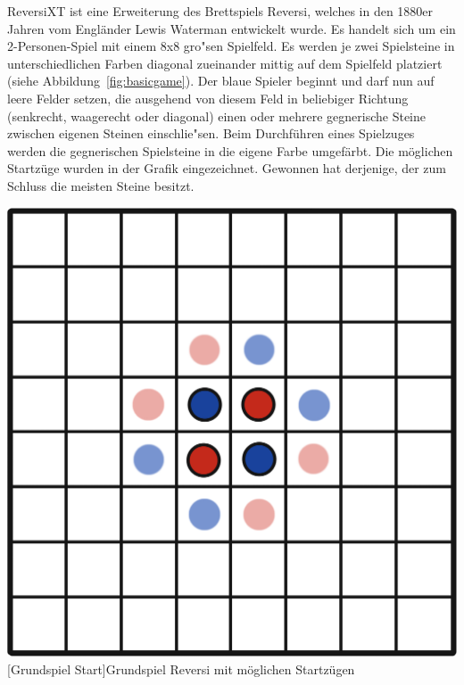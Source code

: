 ReversiXT ist eine Erweiterung des Brettspiels Reversi, welches in den 1880er Jahren vom Engl\"ander Lewis Waterman entwickelt wurde.
Es handelt sich um ein 2-Personen-Spiel mit einem 8x8 gro"sen Spielfeld.
Es werden je zwei Spielsteine in unterschiedlichen Farben diagonal zueinander mittig auf dem Spielfeld platziert (siehe Abbildung~\ref{fig:basicgame}).
Der blaue Spieler beginnt und darf nun auf leere Felder setzen, die ausgehend von diesem Feld in beliebiger Richtung (senkrecht, waagerecht oder diagonal) einen oder mehrere gegnerische Steine zwischen eigenen Steinen einschlie"sen.
Beim Durchf\"uhren eines Spielzuges werden die gegnerischen Spielsteine in die eigene Farbe umgef\"arbt.
Die m\"oglichen Startz\"uge wurden in der Grafik eingezeichnet.
Gewonnen hat derjenige, der zum Schluss die meisten Steine besitzt.

\vspace{1em}
\begin{minipage}{\linewidth}
	\centering
	\includegraphics[width=0.5\linewidth]{pics/basicgame-start}
	[Grundspiel Start]{Grundspiel Reversi mit möglichen Startzügen}
	\label{fig:basicgame}
\end{minipage}

